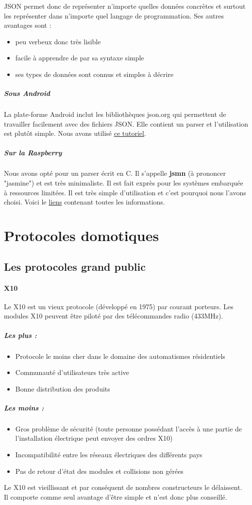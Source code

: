 \documentclass[a4paper,10pt]{article}
\begin{document}
JSON permet donc de représenter n'importe quelles données concrètes et surtout les représenter dans n'importe quel langage de programmation. Ses autres avantages sont :
\begin{itemize}
\item peu verbeux donc très lisible
\item facile à apprendre de par sa syntaxe simple
\item ses types de données sont connus et simples à décrire
\end{itemize}

\subparagraph{Sous Android} La plate-forme Android inclut les bibliothèques json.org qui permettent de travailler facilement avec des fichiers JSON. Elle contient un parser et l'utilisation est plutôt simple. Nous avons utilisé \href{http://vogella.developpez.com/tutoriels/android/utilisation-format-json/}{ce tutoriel}.
\subparagraph{Sur la Raspberry} Nous avons opté pour un parser écrit en C. Il s'appelle \textbf{jsmn} (à prononcer "jasmine") et est très minimaliste. Il est fait exprès pour les systèmes embarquée à ressources limitées. Il est très simple d'utilisation et c'est pourquoi nous l'avons choisi. Voici le \href{http://zserge.com/jsmn.html}{liens} contenant toutes les informations.

\section{Protocoles domotiques}

\subsection{Les protocoles grand public}
\paragraph{X10}
Le X10 est un vieux protocole (développé en 1975) par courant porteurs.  Les modules X10 peuvent être piloté par des télécommandes radio (433MHz). 

\subparagraph{Les plus :}
\begin{itemize}
\item Protocole le moins cher dans le domaine des automatismes résidentiels
\item Communauté d'utilisateurs très active
\item Bonne distribution des produits
\end{itemize}
\subparagraph{Les moins :}
\begin{itemize}
\item Gros problème de sécurité (toute personne possédant l'accès à une partie de l'installation électrique peut envoyer des ordres X10)
\item Incompatibilité entre les réseaux électriques des différents pays
\item Pas de retour d'état des modules et collisions non gérées
\end{itemize}
Le X10 est vieillissant et par conséquent de nombres constructeurs le délaissent. Il comporte comme seul avantage d'être simple et n'est donc plus conseillé.
\end{document}
